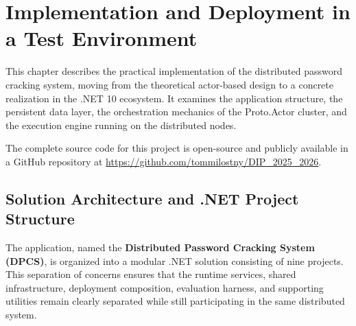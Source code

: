 \chapter{Implementation and Deployment in a Test Environment}
\label{chap:implementation}

This chapter describes the practical implementation of the distributed password cracking system, moving from the theoretical actor-based design to a concrete realization in the .NET 10 ecosystem. It examines the application structure, the persistent data layer, the orchestration mechanics of the Proto.Actor cluster, and the execution engine running on the distributed nodes.

The complete source code for this project is open-source and publicly available in a GitHub repository at \url{https://github.com/tommilostny/DIP_2025_2026}.

\section{Solution Architecture and .NET Project Structure}

The application, named the \textbf{Distributed Password Cracking System (DPCS)}, is organized into a modular .NET solution consisting of nine projects. This separation of concerns ensures that the runtime services, shared infrastructure, deployment composition, evaluation harness, and supporting utilities remain clearly separated while still participating in the same distributed system.

